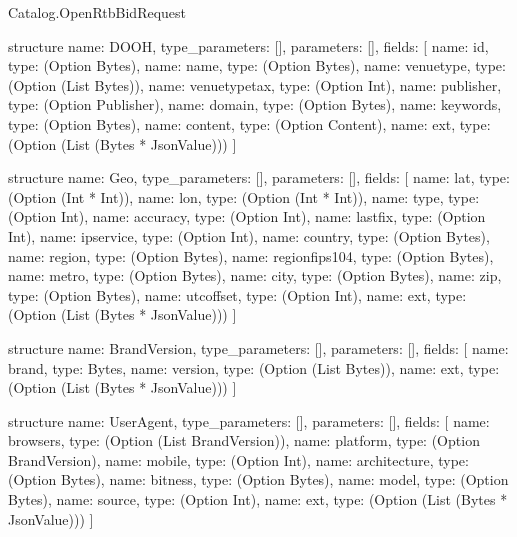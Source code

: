 \begin{lexlean}{Catalog.OpenRtbBidRequest}
\begin{semanticmodule}
structure{
  name: DOOH,
  type_parameters: [],
  parameters: [],
  fields: [
    {name: id, type: (Option Bytes)},
    {name: name, type: (Option Bytes)},
    {name: venuetype, type: (Option (List Bytes))},
    {name: venuetypetax, type: (Option Int)},
    {name: publisher, type: (Option Publisher)},
    {name: domain, type: (Option Bytes)},
    {name: keywords, type: (Option Bytes)},
    {name: content, type: (Option Content)},
    {name: ext, type: (Option (List (Bytes * JsonValue)))}
  ]
}

structure{
  name: Geo,
  type_parameters: [],
  parameters: [],
  fields: [
    {name: lat, type: (Option (Int * Int))},
    {name: lon, type: (Option (Int * Int))},
    {name: type, type: (Option Int)},
    {name: accuracy, type: (Option Int)},
    {name: lastfix, type: (Option Int)},
    {name: ipservice, type: (Option Int)},
    {name: country, type: (Option Bytes)},
    {name: region, type: (Option Bytes)},
    {name: regionfips104, type: (Option Bytes)},
    {name: metro, type: (Option Bytes)},
    {name: city, type: (Option Bytes)},
    {name: zip, type: (Option Bytes)},
    {name: utcoffset, type: (Option Int)},
    {name: ext, type: (Option (List (Bytes * JsonValue)))}
  ]
}

structure{
  name: BrandVersion,
  type_parameters: [],
  parameters: [],
  fields: [
    {name: brand, type: Bytes},
    {name: version, type: (Option (List Bytes))},
    {name: ext, type: (Option (List (Bytes * JsonValue)))}
  ]
}

structure{
  name: UserAgent,
  type_parameters: [],
  parameters: [],
  fields: [
    {name: browsers, type: (Option (List BrandVersion))},
    {name: platform, type: (Option BrandVersion)},
    {name: mobile, type: (Option Int)},
    {name: architecture, type: (Option Bytes)},
    {name: bitness, type: (Option Bytes)},
    {name: model, type: (Option Bytes)},
    {name: source, type: (Option Int)},
    {name: ext, type: (Option (List (Bytes * JsonValue)))}
  ]
}


\end{semanticmodule}
\end{lexlean}
